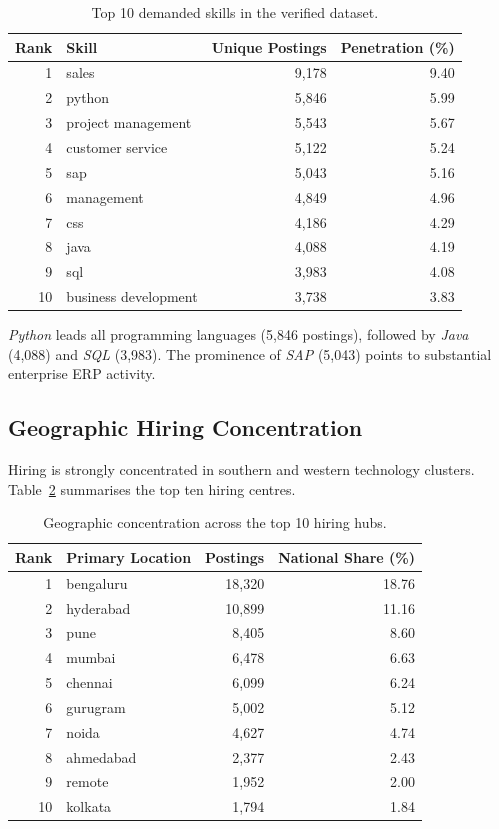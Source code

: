 \documentclass[10pt,a4paper]{article}
\begin{document}
\begin{table}[htbp]
\centering
\small
\begin{tabular}{@{}rlrr@{}}
\toprule
\textbf{Rank} & \textbf{Skill} & \textbf{Unique Postings} & \textbf{Penetration (\%)} \\
\midrule
1 & sales & 9,178 & 9.40 \\
2 & python & 5,846 & 5.99 \\
3 & project management & 5,543 & 5.67 \\
4 & customer service & 5,122 & 5.24 \\
5 & sap & 5,043 & 5.16 \\
6 & management & 4,849 & 4.96 \\
7 & css & 4,186 & 4.29 \\
8 & java & 4,088 & 4.19 \\
9 & sql & 3,983 & 4.08 \\
10 & business development & 3,738 & 3.83 \\
\bottomrule
\end{tabular}
\caption{Top 10 demanded skills in the verified dataset.}
\label{tab:skills}
\end{table}

\textit{Python} leads all programming languages (5,846 postings), followed by \textit{Java} (4,088) and \textit{SQL} (3,983). The prominence of \textit{SAP} (5,043) points to substantial enterprise ERP activity.

\subsection{Geographic Hiring Concentration}
Hiring is strongly concentrated in southern and western technology clusters. Table~\ref{tab:locations} summarises the top ten hiring centres.

\begin{table}[htbp]
\centering
\small
\begin{tabular}{@{}rlrr@{}}
\toprule
\textbf{Rank} & \textbf{Primary Location} & \textbf{Postings} & \textbf{National Share (\%)} \\
\midrule
1 & bengaluru & 18,320 & 18.76 \\
2 & hyderabad & 10,899 & 11.16 \\
3 & pune & 8,405 & 8.60 \\
4 & mumbai & 6,478 & 6.63 \\
5 & chennai & 6,099 & 6.24 \\
6 & gurugram & 5,002 & 5.12 \\
7 & noida & 4,627 & 4.74 \\
8 & ahmedabad & 2,377 & 2.43 \\
9 & remote & 1,952 & 2.00 \\
10 & kolkata & 1,794 & 1.84 \\
\bottomrule
\end{tabular}
\caption{Geographic concentration across the top 10 hiring hubs.}
\label{tab:locations}
\end{table}
\end{document}

